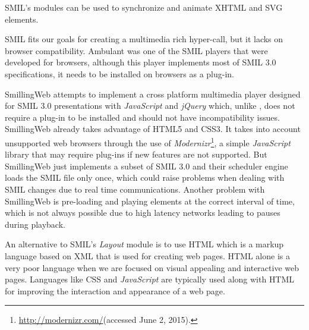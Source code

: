 \documentclass[10pt,conference]{IEEEtran}
\begin{document}
  \gls{SMIL}'s modules can be used to synchronize and animate \gls{XHTML} and \gls{SVG} elements.
  
  \gls{SMIL} fits our goals for creating a multimedia rich hyper-call, but it lacks on browser compatibility. Ambulant \cite{ambulant} was one of the SMIL players that were developed for browsers, although this player implements most of \gls{SMIL} 3.0 \cite{smil3} specifications, it needs to be installed on browsers as a plug-in.

  SmillingWeb \cite{smillingweb} attempts to implement a cross platform multimedia player designed for \gls{SMIL} 3.0 presentations with \emph{JavaScript} and \emph{jQuery} which, unlike \cite{ambulant}, does not require a plug-in to be installed and should not have incompatibility issues. 
  SmillingWeb already takes advantage of \gls{HTML}5 and \gls{CSS}3.
  It takes into account unsupported web browsers through the use of \emph{Modernizr}\footnote{\url{http://modernizr.com/}(accessed June 2, 2015).}, a simple \emph{JavaScript} library that may require plug-ins if new features are not supported.  
  But SmillingWeb just implements a subset of \gls{SMIL} 3.0 and their scheduler engine loads the \gls{SMIL} file only once, which could raise problems when dealing with \gls{SMIL} changes due to real time communications.
  Another problem with SmillingWeb is pre-loading and playing elements at the correct interval of time, which is not always possible due to high latency networks leading to  pauses during playback.



  An alternative to \gls{SMIL}'s \emph{Layout} module is to use \gls{HTML} which is a markup language based on \gls{XML} that is used for creating web pages. \gls{HTML} alone is a very poor language when we are focused on visual appealing and interactive web pages. Languages like \gls{CSS} and \emph{JavaScript} are typically used along with \gls{HTML} for improving the interaction and appearance of a web page. 
\end{document}
